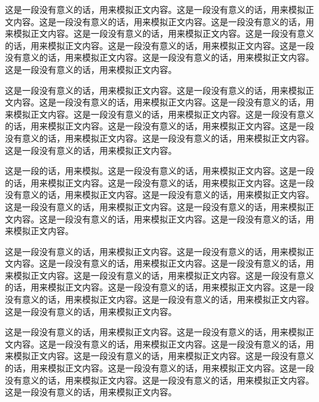 
这是一段没有意义的话，用来模拟正文内容。这是一段没有意义的话，用来模拟正文内容。这是一段没有意义的话，用来模拟正文内容。这是一段没有意义的话，用来模拟正文内容。这是一段没有意义的话，用来模拟正文内容。这是一段没有意义的话，用来模拟正文内容。这是一段没有意义的话，用来模拟正文内容。这是一段没有意义的话，用来模拟正文内容。这是一段没有意义的话，用来模拟正文内容。这是一段没有意义的话，用来模拟正文内容。




这是一段没有意义的话，用来模拟正文内容。这是一段没有意义的话，用来模拟正文内容。这是一段没有意义的话，用来模拟正文内容。这是一段没有意义的话，用来模拟正文内容。这是一段没有意义的话，用来模拟正文内容。这是一段没有意义的话，用来模拟正文内容。这是一段没有意义的话，用来模拟正文内容。这是一段没有意义的话，用来模拟正文内容。这是一段没有意义的话，用来模拟正文内容。这是一段没有意义的话，用来模拟正文内容。



这是一段的话，用来模拟。这是一段没有意义的话，用来模拟正文内容。这是一段的话，用来模拟正文内容。这是一段没有意义的话，用来模拟正文内容。这是一段没有意义的话，用来模拟正文内容。这是一段没有意义的话，用来模拟正文内容。这是一段没有意义的话，用来模拟正文内容。这是一段没有意义的话，用来模拟正文内容。这是一段没有意义的话，用来模拟正文内容。这是一段没有意义的话，用来模拟正文内容。

这是一段没有意义的话，用来模拟正文内容。这是一段没有意义的话，用来模拟正文内容。这是一段没有意义的话，用来模拟正文内容。这是一段没有意义的话，用来模拟正文内容。这是一段没有意义的话，用来模拟正文内容。这是一段没有意义的话，用来模拟正文内容。这是一段没有意义的话，用来模拟正文内容。这是一段没有意义的话，用来模拟正文内容。这是一段没有意义的话，用来模拟正文内容。这是一段没有意义的话，用来模拟正文内容。

这是一段没有意义的话，用来模拟正文内容。这是一段没有意义的话，用来模拟正文内容。这是一段没有意义的话，用来模拟正文内容。这是一段没有意义的话，用来模拟正文内容。这是一段没有意义的话，用来模拟正文内容。这是一段没有意义的话，用来模拟正文内容。这是一段没有意义的话，用来模拟正文内容。这是一段没有意义的话，用来模拟正文内容。这是一段没有意义的话，用来模拟正文内容。这是一段没有意义的话，用来模拟正文内容。

